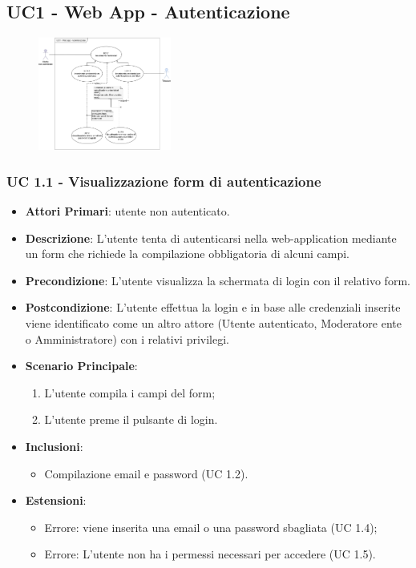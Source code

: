 	\subsection{UC1 - Web App - Autenticazione}
		
		\begin{figure}[t!]
			\centering
			\includegraphics[height=10em]{res/images/uc1}
		\end{figure}
		

		\subsubsection{UC 1.1 - Visualizzazione form di autenticazione}

		\begin{itemize}
			\item \textbf{Attori Primari}: utente non autenticato.
			\item \textbf{Descrizione}: L'utente tenta di autenticarsi nella web-application mediante un form che richiede la compilazione obbligatoria di alcuni campi.
			\item \textbf{Precondizione}: L'utente visualizza la schermata di login con il relativo form.
			\item \textbf{Postcondizione}: L'utente effettua la login e in base alle credenziali inserite viene identificato come un altro attore (Utente autenticato, Moderatore ente o Amministratore) con i relativi privilegi.
			\item \textbf{Scenario Principale}:
			\begin{enumerate}
				\item L'utente compila i campi del form;
				\item L'utente preme il pulsante di login.
			\end{enumerate}
			\item \textbf{Inclusioni}:
				\begin{itemize}
					\item Compilazione email e password (UC 1.2).
				\end{itemize}
			\item \textbf{Estensioni}:
				\begin{itemize}
					\item Errore: viene inserita una email o una password sbagliata (UC 1.4);
					\item Errore: L'utente non ha i permessi necessari per accedere (UC 1.5).
				\end{itemize}
		\end{itemize}

